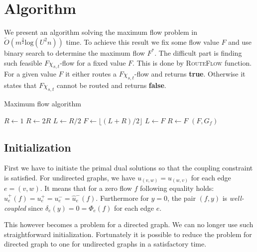 \section{Algorithm}
We present an algorithm solving the maximum flow problem in $\tilde O(m^\frac{3}{2}\text{log}(U^2n))$ time. To achieve this result we fix some flow value $F$ and use binary search to determine the maximum flow $F^*$. The difficult part is finding such feasible $F\chi_{s,t}$-flow for a fixed value $F$. This is done by \textsc{RouteFlow} function. For a given value $F$ it either routes a $F\chi_{s,t}$-flow and returns \textbf{true}. Otherwise it states that $F\chi_{s,t}$ cannot be routed and returns \textbf{false}.
\begin{algorithm}
\caption{Maximum flow algorithm}\label{flow_main_algo}
\begin{algorithmic}[1]
\State $R \gets 1$
    \State $R \gets 2R$
\EndWhile
\State $L \gets R/2$
    \State $F \gets \lfloor(L+R)/2\rfloor$
        \State $L\gets F$ 
    \Else
        \State $R\gets F$
    \EndIf
\EndWhile
\State {} 
\State {}
\State \Return $(F, G_f)$
\EndFunction
\end{algorithmic}
\end{algorithm}

\subsection{Initialization}
First we have to initiate the primal dual solutions so that the coupling constraint is satisfied. For undirected graphs, we have $u_{(v,w)} = u_{(w,v)}$ for each edge $e=(v,w)$. It means that for a zero flow $f$ following equality holds: $\hat u_e^+(f)=u_e^+=u_e^-=\hat u_e^-(f)$. Furthermore for $y=0$, the pair $(f,y)$ is \textit{well-coupled} since $\delta_e(y) = 0 = \Phi_e(f)$ for each edge $e$.

This however becomes a problem for a directed graph. We can no longer use such straightforward initialization. Fortunately it is possible to reduce the problem for directed graph to one for undirected graphs in a satisfactory time.

